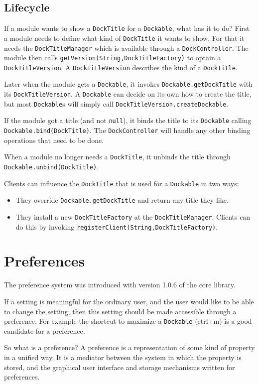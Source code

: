 \documentclass[a4paper,10pt]{article}
\newcommand{\src}[1]{\lstinline[basicstyle=\normalsize\ttfamily,keywordstyle=\normalsize\ttfamily,identifierstyle=\normalsize\ttfamily]|#1|}
\begin{document}
\subsection{Lifecycle}
If a module wants to show a \src{DockTitle} for a \src{Dockable}, what has it to do? First a module needs to define what kind of \src{DockTitle} it wants to show. For that it needs the \src{DockTitleManager} which is available through a \src{DockController}. The module then calls \src{getVersion(String,DockTitleFactory)} to optain a \src{DockTitleVersion}. A \src{DockTitleVersion} describes the kind of a \src{DockTitle}.

Later when the module gets a \src{Dockable}, it invokes \src{Dockable.getDockTitle} with its \src{DockTitleVersion}. A \src{Dockable} can decide on its own how to create the title, but most \src{Dockable}s will simply call \src{DockTitleVersion.createDockable}.

If the module got a title (and not \src{null}), it binds the title to its \src{Dockable} calling \src{Dockable.bind(DockTitle)}. The \src{DockController} will handle any other binding operations that need to be done.

When a module no longer needs a \src{DockTitle}, it unbinds the title through \src{Dockable.unbind(DockTitle)}.

Clients can influence the \src{DockTitle} that is used for a \src{Dockable} in two ways:
\begin{itemize}
 \item They override \src{Dockable.getDockTitle} and return any title they like.
 \item They install a new \src{DockTitleFactory} at the \src{DockTitleManager}. Clients can do this by invoking \src{registerClient(String,DockTitleFactory)}.
\end{itemize}

\section{Preferences}
The preference system was introduced with version 1.0.6 of the core library.

If a setting is meaningful for the ordinary user, and the user would like to be able to change the setting, then this setting should be made accessible through a preference. For example the shortcut to maximize a \src{Dockable} (ctrl+m) is a good candidate for a preference.

So what is a preference? A preference is a representation of some kind of property in a unified way. It is a mediator between the system in which the property is stored, and the graphical user interface and storage mechanisms written for preferences.
\end{document}
